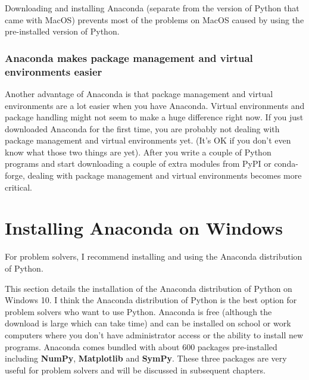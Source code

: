 \documentclass{book}
\begin{document}
Downloading and installing Anaconda (separate from the version of Python
that came with MacOS) prevents most of the problems on MacOS caused by
using the pre-installed version of Python.

\hypertarget{anaconda-makes-package-management-and-virtual-environments-easier}{%
\subsubsection{Anaconda makes package management and virtual
environments
easier}\label{anaconda-makes-package-management-and-virtual-environments-easier}}

Another advantage of Anaconda is that package management and virtual
environments are a lot easier when you have Anaconda. Virtual
environments and package handling might not seem to make a huge
difference right now. If you just downloaded Anaconda for the first
time, you are probably not dealing with package management and virtual
environments yet. (It's OK if you don't even know what those two things
are yet). After you write a couple of Python programs and start
downloading a couple of extra modules from PyPI or conda-forge, dealing
with package management and virtual environments becomes more critical.
    




    
        \hypertarget{installing-anaconda-on-windows}{%
\section{Installing Anaconda on
Windows}\label{installing-anaconda-on-windows}}
    




    
        For problem solvers, I recommend installing and using the Anaconda
distribution of Python.
    




    
        This section details the installation of the Anaconda distribution of
Python on Windows 10. I think the Anaconda distribution of Python is the
best option for problem solvers who want to use Python. Anaconda is free
(although the download is large which can take time) and can be
installed on school or work computers where you don't have administrator
access or the ability to install new programs. Anaconda comes bundled
with about 600 packages pre-installed including \textbf{NumPy},
\textbf{Matplotlib} and \textbf{SymPy}. These three packages are very
useful for problem solvers and will be discussed in subsequent chapters.
\end{document}
